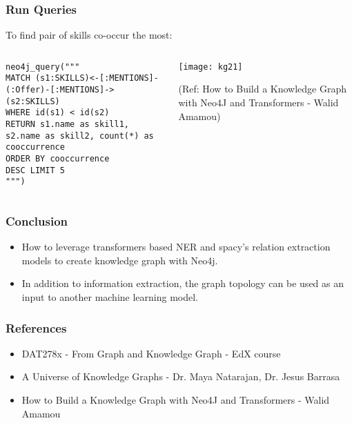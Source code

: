 \begin{frame}[fragile]\frametitle{Run Queries}

To find  pair of skills co-occur the most:

\begin{columns}
    \begin{column}[T]{0.6\linewidth}
		
			\begin{lstlisting}
neo4j_query("""
MATCH (s1:SKILLS)<-[:MENTIONS]-(:Offer)-[:MENTIONS]->(s2:SKILLS)
WHERE id(s1) < id(s2)
RETURN s1.name as skill1, s2.name as skill2, count(*) as cooccurrence
ORDER BY cooccurrence
DESC LIMIT 5
""")
			\end{lstlisting}
    \end{column}
    \begin{column}[T]{0.4\linewidth}
			\begin{center}
			\texttt{[image: kg21]}
			\end{center}	
			
			{\tiny (Ref: How to Build a Knowledge Graph with Neo4J and Transformers - Walid Amamou)}	
    \end{column}			
\end{columns}
			
\end{frame}

\begin{frame}[fragile]\frametitle{Conclusion}

\begin{itemize}
\item How to leverage transformers based NER and spacy’s relation extraction models to create knowledge graph with Neo4j.
\item In addition to information extraction, the graph topology can be used as an input to another machine learning model. 
\end{itemize}
	  
\end{frame}






\begin{frame}[fragile]\frametitle{References}

\begin{itemize}
\item DAT278x - From Graph and Knowledge Graph - EdX course
\item A Universe of Knowledge Graphs -  Dr. Maya Natarajan, Dr. Jesus Barrasa
\item How to Build a Knowledge Graph with Neo4J and Transformers - Walid Amamou
\end{itemize}
	  
\end{frame}


